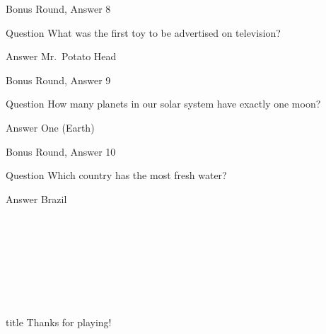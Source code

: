 \documentclass[11pt]{beamer}
\begin{document}
\begin{frame}[t]{Bonus Round, Answer 8}
\vspace{2em}
\begin{block}{Question}
What was the first toy to be advertised on television\@?
\end{block}
\pause{}
\begin{block}{Answer}
Mr.\ Potato Head
\end{block}
\end{frame}
    

\begin{frame}[t]{Bonus Round, Answer 9}
\vspace{2em}
\begin{block}{Question}
How many planets in our solar system have exactly one moon\@?
\end{block}
\pause{}
\begin{block}{Answer}
One (Earth)
\end{block}
\end{frame}
    

\begin{frame}[t]{Bonus Round, Answer 10}
\vspace{2em}
\begin{block}{Question}
Which country has the most fresh water\@?
\end{block}
\pause{}
\begin{block}{Answer}
Brazil
\end{block}
\end{frame}
    

\section*{\ }
\subsection*{\ }
\begingroup{}
\begin{frame}
\vfill{}
\centering{}
\begin{beamercolorbox}[sep=8pt,center,shadow=true,rounded=true]{title}
Thanks for playing!\par%
\end{beamercolorbox}
\vfill{}
\end{frame}
\endgroup{}
\end{document}
